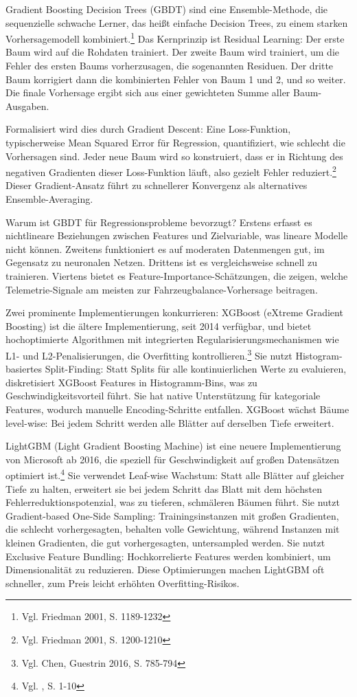 Gradient Boosting Decision Trees (GBDT) sind eine Ensemble-Methode, die sequenzielle schwache Lerner, das heißt einfache Decision Trees, zu einem starken Vorhersagemodell kombiniert.\footnote{Vgl. Friedman 2001, S. 1189-1232} Das Kernprinzip ist Residual Learning: Der erste Baum wird auf die Rohdaten trainiert. Der zweite Baum wird trainiert, um die Fehler des ersten Baums vorherzusagen, die sogenannten Residuen. Der dritte Baum korrigiert dann die kombinierten Fehler von Baum 1 und 2, und so weiter. Die finale Vorhersage ergibt sich aus einer gewichteten Summe aller Baum-Ausgaben.

Formalisiert wird dies durch Gradient Descent: Eine Loss-Funktion, typischerweise Mean Squared Error für Regression, quantifiziert, wie schlecht die Vorhersagen sind. Jeder neue Baum wird so konstruiert, dass er in Richtung des negativen Gradienten dieser Loss-Funktion läuft, also gezielt Fehler reduziert.\footnote{Vgl. Friedman 2001, S. 1200-1210} Dieser Gradient-Ansatz führt zu schnellerer Konvergenz als alternatives Ensemble-Averaging.

Warum ist GBDT für Regressionsprobleme bevorzugt? Erstens erfasst es nichtlineare Beziehungen zwischen Features und Zielvariable, was lineare Modelle nicht können. Zweitens funktioniert es auf moderaten Datenmengen gut, im Gegensatz zu neuronalen Netzen. Drittens ist es vergleichsweise schnell zu trainieren. Viertens bietet es Feature-Importance-Schätzungen, die zeigen, welche Telemetrie-Signale am meisten zur Fahrzeugbalance-Vorhersage beitragen.

Zwei prominente Implementierungen konkurrieren: XGBoost (eXtreme Gradient Boosting) ist die ältere Implementierung, seit 2014 verfügbar, und bietet hochoptimierte Algorithmen mit integrierten Regularisierungsmechanismen wie L1- und L2-Penalisierungen, die Overfitting kontrollieren.\footnote{Vgl. Chen, Guestrin 2016, S. 785-794} Sie nutzt Histogram-basiertes Split-Finding: Statt Splits für alle kontinuierlichen Werte zu evaluieren, diskretisiert XGBoost Features in Histogramm-Bins, was zu Geschwindigkeitsvorteil führt. Sie hat native Unterstützung für kategoriale Features, wodurch manuelle Encoding-Schritte entfallen. XGBoost wächst Bäume level-wise: Bei jedem Schritt werden alle Blätter auf derselben Tiefe erweitert.

LightGBM (Light Gradient Boosting Machine) ist eine neuere Implementierung von Microsoft ab 2016, die speziell für Geschwindigkeit auf großen Datensätzen optimiert ist.\footnote{Vgl. \cite{Ke2017}, S. 1-10} Sie verwendet Leaf-wise Wachstum: Statt alle Blätter auf gleicher Tiefe zu halten, erweitert sie bei jedem Schritt das Blatt mit dem höchsten Fehlerreduktionspotenzial, was zu tieferen, schmäleren Bäumen führt. Sie nutzt Gradient-based One-Side Sampling: Trainingsinstanzen mit großen Gradienten, die schlecht vorhergesagten, behalten volle Gewichtung, während Instanzen mit kleinen Gradienten, die gut vorhergesagten, untersampled werden. Sie nutzt Exclusive Feature Bundling: Hochkorrelierte Features werden kombiniert, um Dimensionalität zu reduzieren. Diese Optimierungen machen LightGBM oft schneller, zum Preis leicht erhöhten Overfitting-Risikos.


